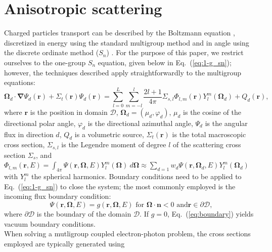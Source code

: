 \documentclass[preprint,10pt]{elsarticle}
\newcommand\bn{\boldsymbol{\nabla}}
\newcommand\bo{\boldsymbol{\Omega}}
\newcommand\br{\mathbf{r}}
\newcommand\bs{\boldsymbol}
\renewcommand{\(}{\left(}
\renewcommand{\)}{\right)}
\renewcommand{\[}{\left[}
\renewcommand{\]}{\right]}
\newcommand{\eqt}[1]{Eq.~(\ref{#1})}                     %
\begin{document}
\section{Anisotropic scattering} \label{sec:anisotropy}

Charged particles transport can be described by the Boltzmann equation
\cite{graal}, discretized in energy using the standard multigroup method
and in angle using the discrete ordinate method ($S_n$)
\cite{reuss}. For the purpose of this paper, we restrict ourselves to the one-group $S_n$ equation,
given below in \eqt{eq:1-g_sn}; however, the techniques described apply straightforwardly to the multigroup equations:
%
\begin{equation}
\bo_d \cdot \bn \Psi_d(\br) + \Sigma_{t}(\br) \Psi_d(\br) = 
\sum_{l=0}^L\sum_{m=-l}^l \frac{2l+1}{4\pi}\Sigma_{s,l}
\Phi_{l,m}(\br)Y_l^m(\bo_d) + Q_d(\br) ,
\label{eq:1-g_sn}
\end{equation}
%
where $\br$ is the position in domain $\mathcal{D}$, $\bo_d=(\mu_d,\varphi_d)$, 
$\mu_d$ is the cosine of the directional polar angle,
$\varphi_d$ is the directional azimuthal angle, $\Psi_d$ is
the angular flux in direction $d$, $Q_d$ is a volumetric source, $\Sigma_{t}(\br)$ is the total 
macroscopic cross section, $\Sigma_{s,l}$ is the Legendre moment of 
degree $l$ of the scattering cross section $\Sigma_s$, and $\Phi_{l,m}(\br,E)= \int_{4\pi}\Psi(\br,\bo,E)Y_l^{m}(\bo)\ d\bo
\approx \sum_{d=1} w_d \Psi(\br,\bo_d,E)Y_l^{m}(\bo_d)$ with  $Y_l^m$ the 
spherical harmonics.
%
Boundary conditions need to be applied to \eqt{eq:1-g_sn} to close the system; the most
commonly employed is the incoming flux boundary condition:
%
\begin{equation}
\Psi(\br,\bo,E) = g(\br,\bo,E)\textrm{ for }\bo\cdot\bs{n}<0\textrm{ and
}\br\in \partial \mathcal{D},
\label{eq:boundary}
\end{equation} 
%
where $\partial \mathcal{D}$ is the boundary of the domain $\mathcal{D}$. If $g=0$, \eqt{eq:boundary}
yields vacuum boundary conditions.\\
When solving a mutligroup coupled electron-photon problem, the cross sections employed are typically generated using
\end{document}
